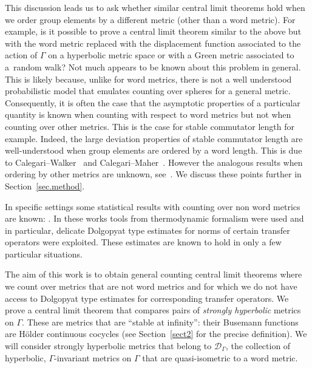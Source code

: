 \documentclass[AHL,Unicode,longabstracts,published]{cedram}
\newcommand{\G}{\Gamma}
\newcommand{\Dc}{\mathcal{D}}
\newcounter{setofcase}
\newcounter{case}[setofcase]
\theoremstyle{plain}
\newcommand{\G}{\Gamma}
\begin{document}
This discussion leads us to ask whether similar central limit theorems hold when we order group elements by a different metric (other than a word metric). For example, is it possible to prove a central limit theorem similar to the above but with the word metric replaced with the displacement function associated to the action of $\G$ on a hyperbolic metric space or with a Green metric associated to a~random walk? Not much appears to be known about this problem in general. This is likely because, unlike for word metrics, there is not a well understood probabilistic model that emulates counting over spheres for a general metric. Consequently, it is often the case that the asymptotic properties of a particular quantity is known when counting with respect to word metrics but not when counting over other metrics. This is the case for stable commutator length for example. Indeed, the large deviation properties of stable commutator length are well-understood when group elements are ordered by a word length. This is due to Calegari--Walker~\cite{calegari.walker} and Calegari--Maher~\cite{calegari.maher}. However the analogous results when ordering by other metrics are unknown, see~\cite[Conjecture~A.11]{calegari.walker}. We discuss these points further in Section~\ref{sec.method}.



In specific settings some statistical results with counting over non word metrics are known: \cite{babillot.ledrappier,cantrell.pollicott,lalley,schwartz.sharp}. In these works tools from thermodynamic formalism were used and in particular, delicate Dolgopyat type estimates for norms of certain transfer operators were exploited. These estimates are known to hold in only a few particular situations.



The aim of this work is to obtain general counting central limit theorems where we count over metrics that are not word metrics and for which we do not have access to Dolgopyat type estimates for corresponding transfer operators. We prove a central limit theorem that compares pairs of \emph{strongly hyperbolic} metrics on $\G$. These are metrics that are ``stable at infinity'': their Busemann functions are H\"older continuous cocycles (see Section~\ref{sect2} for the precise definition). We will consider strongly hyperbolic metrics that belong to $\Dc_\G$, the collection of hyperbolic, $\G$-invariant metrics on $\G$ that are quasi-isometric to a word metric.
\end{document}
